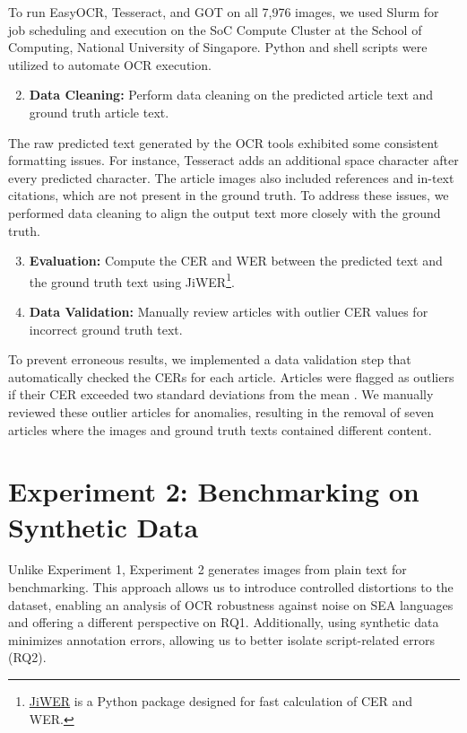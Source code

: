 \documentclass[12pt,oneside]{memoir}
\begin{document}
To run EasyOCR, Tesseract, and GOT on all 7,976 images, we used Slurm for job scheduling and execution on the SoC Compute Cluster at the School of Computing, National University of Singapore. Python and shell scripts were utilized to automate OCR execution.

\begin{enumerate}
    \setcounter{enumi}{1}
    \item \textbf{Data Cleaning:} Perform data cleaning on the predicted article text and ground truth article text.
\end{enumerate}

The raw predicted text generated by the OCR tools exhibited some consistent formatting issues.
For instance, Tesseract adds an additional space character after every predicted character.
The article images also included references and in-text citations, which are not present in the ground truth.
To address these issues, we performed data cleaning to align the output text more closely with the ground truth.

\begin{enumerate}
    \setcounter{enumi}{2}
    \item \textbf{Evaluation:} Compute the CER and WER between the predicted text and the ground truth text using JiWER\footnote{\href{https://pypi.org/project/jiwer/}{JiWER} is a Python package designed for fast calculation of CER and WER.}.
    \item \textbf{Data Validation:} Manually review articles with outlier CER values for incorrect ground truth text.
\end{enumerate}

To prevent erroneous results, we implemented a data validation step that automatically checked the CERs for each article.
Articles were flagged as outliers if their CER exceeded two standard deviations from the mean \parencite{cousineau-and-chartier-2010}. 
We manually reviewed these outlier articles for anomalies, resulting in the removal 
of seven articles where the images and ground truth texts contained different content.


\section{Experiment 2: Benchmarking on Synthetic Data}

Unlike Experiment 1, Experiment 2 generates images from plain text for benchmarking. 
This approach allows us to introduce controlled distortions to the dataset, enabling an analysis of OCR robustness against noise on SEA languages and offering a different perspective on RQ1.
Additionally, using synthetic data minimizes annotation errors, allowing us to better isolate script-related errors (RQ2).
\end{document}

